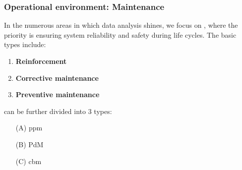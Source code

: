 \begin{frame}
    \frametitle{Operational environment: Maintenance}
    \vspace*{\fill}
    In the numerous areas in which data analysis shines, we focus on , where the
    priority is ensuring system reliability and safety during life cycles.
    The basic types include: %
    \pause
    \begin{enumerate}
        \item \textbf{Reinforcement} %
        \item \textbf{Corrective maintenance} %
        \item \textbf{Preventive maintenance} %
    \end{enumerate}

    \pause
     can be further divided into 3 types:
    \pause
    \begin{enumerate}%
        \item[(A)] \acl{ppm} %
        \item[(B)] \acl{PdM} %
        \item[(C)] \acl{cbm} %
    \end{enumerate}

    \vspace*{\fill}
\end{frame}

